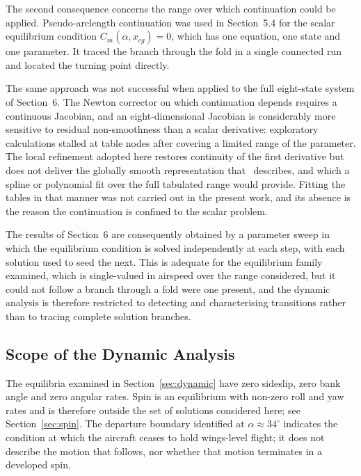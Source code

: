 \documentclass[
bindingoffset=5mm,  %
footnoteindent=3mm, %
hyphenation=true    %
]{src/wut-thesis}
\begin{document}
 The second consequence concerns the range over which continuation could be
 applied. Pseudo-arclength continuation was used in Section~5.4 for the scalar
 equilibrium condition $C_{m}(\alpha, x_{cg}) = 0$, which has one equation, one
 state and one parameter. It traced the branch through the fold in a single
 connected run and located the turning point directly.
 
 The same approach was not successful when applied to the full eight-state
 system of Section~6. The Newton corrector on which continuation depends
 requires a continuous Jacobian, and an eight-dimensional Jacobian is
 considerably more sensitive to residual non-smoothness than a scalar
 derivative: exploratory calculations stalled at table nodes after covering a
 limited range of the parameter. The local refinement adopted here restores
 continuity of the first derivative but does not deliver the globally smooth
 representation that~\cite{goman1998} describes, and which a spline or
 polynomial fit over the full tabulated range would provide. Fitting the tables
 in that manner was not carried out in the present work, and its absence is the
 reason the continuation is confined to the scalar problem.
 
 The results of Section~6 are consequently obtained by a parameter sweep in
 which the equilibrium condition is solved independently at each step, with
 each solution used to seed the next. This is adequate for the equilibrium
 family examined, which is single-valued in airspeed over the range considered,
 but it could not follow a branch through a fold were one present, and the
 dynamic analysis is therefore restricted to detecting and characterising
 transitions rather than to tracing complete solution branches.
 
 \subsection{Scope of the Dynamic Analysis}
 
 The equilibria examined in Section~\ref{sec:dynamic} have zero sideslip, zero
 bank angle and zero angular rates. Spin is an equilibrium with non-zero roll and yaw rates and is therefore outside the set of solutions considered here; see Section~\ref{sec:spin}.
 The departure boundary identified at $\alpha \approx 34^{\circ}$ indicates the
 condition at which the aircraft ceases to hold wings-level flight; it does not
 describe the motion that follows, nor whether that motion terminates in a
 developed spin.
 
\end{document}
